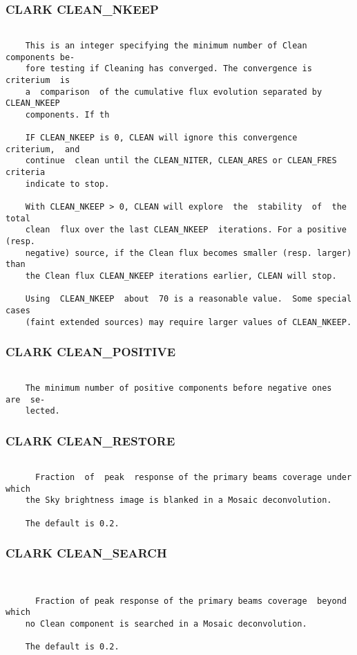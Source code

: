 \subsubsection{CLARK CLEAN\_NKEEP}
\begin{verbatim}

    This is an integer specifying the minimum number of Clean components be-
    fore testing if Cleaning has converged. The convergence is criterium  is
    a  comparison  of the cumulative flux evolution separated by CLEAN_NKEEP
    components. If th

    IF CLEAN_NKEEP is 0, CLEAN will ignore this convergence  criterium,  and
    continue  clean until the CLEAN_NITER, CLEAN_ARES or CLEAN_FRES criteria
    indicate to stop.

    With CLEAN_NKEEP > 0, CLEAN will explore  the  stability  of  the  total
    clean  flux over the last CLEAN_NKEEP  iterations. For a positive (resp.
    negative) source, if the Clean flux becomes smaller (resp. larger)  than
    the Clean flux CLEAN_NKEEP iterations earlier, CLEAN will stop.

    Using  CLEAN_NKEEP  about  70 is a reasonable value.  Some special cases
    (faint extended sources) may require larger values of CLEAN_NKEEP.

\end{verbatim}
\subsubsection{CLARK CLEAN\_POSITIVE}
\begin{verbatim}

    The minimum number of positive components before negative ones  are  se-
    lected.

\end{verbatim}
\subsubsection{CLARK CLEAN\_RESTORE}
\begin{verbatim}

      Fraction  of  peak  response of the primary beams coverage under which
    the Sky brightness image is blanked in a Mosaic deconvolution.

    The default is 0.2.

\end{verbatim}
\subsubsection{CLARK CLEAN\_SEARCH}
\begin{verbatim}


      Fraction of peak response of the primary beams coverage  beyond  which
    no Clean component is searched in a Mosaic deconvolution.

    The default is 0.2.

\end{verbatim}
